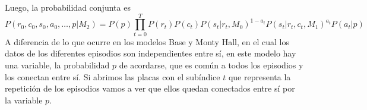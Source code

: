 \documentclass[a4paper,10pt]{article}
\begin{document}
\vspace{0.3cm}

Luego, la probabilidad conjunta es
%
\begin{equation} \label{eq_conjunta_modelo_alternativo}
P(r_0,c_0,s_0,a_0, \dots, p|M_2) = P(p)\prod_{t=0}^T P(r_t) P(c_t) P(s_t|r_t,M_0)^{1-a_t} P(s_t|r_t,c_t,M_1)^{a_t} P(a_t|p)
\end{equation}
%
A diferencia de lo que ocurre en los modelos Base y Monty Hall, en el cual los datos de los diferentes episodios son independientes entre sí, en este modelo hay una variable, la probabilidad $p$ de acordarse, que es común a todos los episodios y los conectan entre sí.
%
Si abrimos las placas con el subíndice $t$ que representa la repetición de los episodios vamos a ver que ellos quedan conectados entre sí por la variable $p$.

\end{document}
